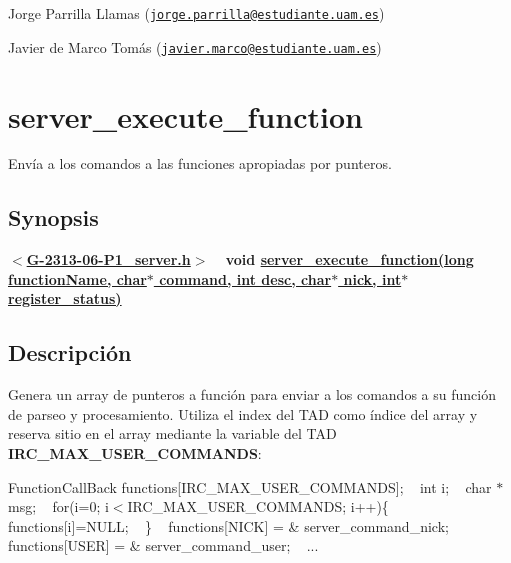 \begin{DoxyItemize}
\item Jorge Parrilla Llamas (\href{mailto:jorge.parrilla@estudiante.uam.es}{\tt jorge.\+parrilla@estudiante.\+uam.\+es}) 
\item Javier de Marco Tomás (\href{mailto:javier.marco@estudiante.uam.es}{\tt javier.\+marco@estudiante.\+uam.\+es}) 
\end{DoxyItemize}\hypertarget{server_execute_function}{}\section{server\+\_\+execute\+\_\+function}\label{server_execute_function}
Envía a los comandos a las funciones apropiadas por punteros.\hypertarget{server_execute_function_synopsis5}{}\subsection{Synopsis}\label{server_execute_function_synopsis5}
{ {\bfseries $<$\hyperlink{G-2313-06-P1__server_8h}{G-\/2313-\/06-\/\+P1\+\_\+server.\+h}$>$} ~\newline
 {\bfseries void \hyperlink{G-2313-06-P1__server_8c_a775161328c3264fb8f96981f7a9c83ae}{server\+\_\+execute\+\_\+function(long function\+Name, char$\ast$ command, int desc, char$\ast$ nick, int$\ast$ register\+\_\+status)}} } \hypertarget{server_execute_function_descripcion5}{}\subsection{Descripción}\label{server_execute_function_descripcion5}
Genera un array de punteros a función para enviar a los comandos a su función de parseo y procesamiento. Utiliza el index del T\+AD como índice del array y reserva sitio en el array mediante la variable del T\+AD {\bfseries I\+R\+C\+\_\+\+M\+A\+X\+\_\+\+U\+S\+E\+R\+\_\+\+C\+O\+M\+M\+A\+N\+DS}\+:

{\ttfamily  Function\+Call\+Back functions\mbox{[}I\+R\+C\+\_\+\+M\+A\+X\+\_\+\+U\+S\+E\+R\+\_\+\+C\+O\+M\+M\+A\+N\+DS\mbox{]}; ~\newline
int i; ~\newline
char $\ast$msg; ~\newline
for(i=0; i$<$I\+R\+C\+\_\+\+M\+A\+X\+\_\+\+U\+S\+E\+R\+\_\+\+C\+O\+M\+M\+A\+N\+DS; i++)\{ ~\newline
 functions\mbox{[}i\mbox{]}=N\+U\+LL; ~\newline
\} ~\newline
functions\mbox{[}N\+I\+CK\mbox{]} = \& server\+\_\+command\+\_\+nick; ~\newline
functions\mbox{[}U\+S\+ER\mbox{]} = \& server\+\_\+command\+\_\+user; ~\newline
...} 

